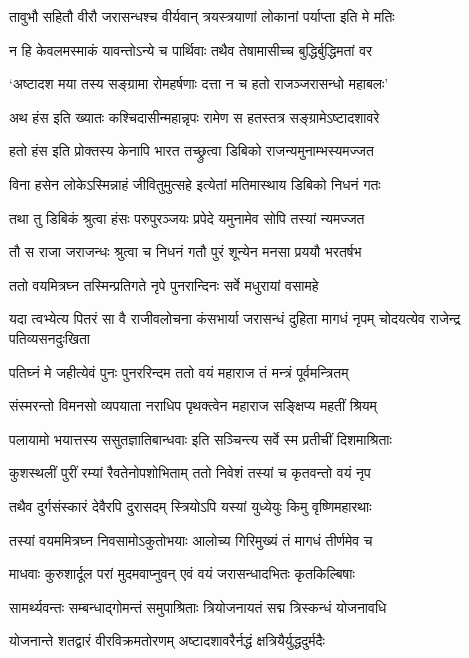 \twolineshloka
{तावुभौ सहितौ वीरौ जरासन्धश्च वीर्यवान्}
{त्रयस्त्रयाणां लोकानां पर्याप्ता इति मे मतिः}


\twolineshloka
{न हि केवलमस्माकं यावन्तोऽन्ये च पार्थिवाः}
{तथैव तेषामासीच्च बुद्धिर्बुद्धिमतां वर}


\twolineshloka
{`अष्टादश मया तस्य सङ्ग्रामा रोमहर्षणाः}
{दत्ता न च हतो राजञ्जरासन्धो महाबलः'}


\twolineshloka
{अथ हंस इति ख्यातः कश्चिदासीन्महान्नृपः}
{रामेण स हतस्तत्र सङ्ग्रामेऽष्टादशावरे}


\twolineshloka
{हतो हंस इति प्रोक्तस्य केनापि भारत}
{तच्छ्रुत्वा डिबिको राजन्यमुनाम्भस्यमज्जत}


\twolineshloka
{विना हसेन लोकेऽस्मिन्नाहं जीवितुमुत्सहे}
{इत्येतां मतिमास्थाय डिबिको निधनं गतः}


\twolineshloka
{तथा तु डिबिकं श्रुत्वा हंसः परुपुरञ्जयः}
{प्रपेदे यमुनामेव सोपि तस्यां न्यमज्जत}


\twolineshloka
{तौ स राजा जराजन्धः श्रुत्वा च निधनं गतौ}
{पुरं शून्येन मनसा प्रययौ भरतर्षभ}


\twolineshloka
{ततो वयमित्रघ्न तस्मिन्प्रतिगते नृपे}
{पुनरान्दिनः सर्वे मधुरायां वसामहे}


\threelineshloka
{यदा त्वभ्येत्य पितरं सा वै राजीवलोचना}
{कंसभार्या जरासन्धं दुहिता मागधं नृपम्}
{चोदयत्येव राजेन्द्र पतिव्यसनदुःखिता}


\twolineshloka
{पतिघ्नं मे जहीत्येवं पुनः पुनररिन्दम}
{ततो वयं महाराज तं मन्त्रं पूर्वमन्त्रितम्}


\twolineshloka
{संस्मरन्तो विमनसो व्यपयाता नराधिप}
{पृथक्त्वेन महाराज सङ्क्षिप्य महतीं श्रियम्}


\twolineshloka
{पलायामो भयात्तस्य ससुतज्ञातिबान्धवाः}
{इति सञ्चिन्त्य सर्वे स्म प्रतीचीं दिशमाश्रिताः}


\twolineshloka
{कुशस्थलीं पुरीं रम्यां रैवतेनोपशोभिताम्}
{ततो निवेशं तस्यां च कृतवन्तो वयं नृप}


\twolineshloka
{तथैव दुर्गसंस्कारं देवैरपि दुरासदम्}
{स्त्रियोऽपि यस्यां युध्येयुः किमु वृष्णिमहारथाः}


\twolineshloka
{तस्यां वयममित्रघ्न निवसामोऽकुतोभयाः}
{आलोच्य गिरिमुख्यं तं मागधं तीर्णमेव च}


\twolineshloka
{माधवाः कुरुशार्दूल परां मुदमवाप्नुवन्}
{एवं वयं जरासन्धादभितः कृतकिल्बिषाः}


\twolineshloka
{सामर्थ्यवन्तः सम्बन्धाद्गोमन्तं समुपाश्रिताः}
{त्रियोजनायतं सद्म त्रिस्कन्धं योजनावधि}


\twolineshloka
{योजनान्ते शतद्वारं वीरविक्रमतोरणम्}
{अष्टादशावरैर्नद्धं क्षत्रियैर्युद्धदुर्मदैः}


